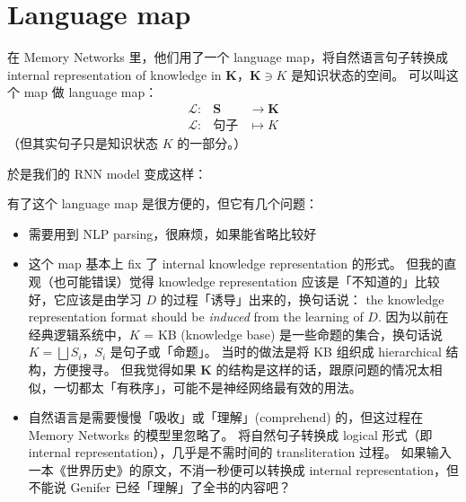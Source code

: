 \documentclass[12pt]{article}
\begin{document}
\section{Language map}

在 Memory Networks\cite{Weston2015} 里，他们用了一个 language map，将自然语言句子转换成 internal representation of knowledge in $\mathbf{K}$，$\mathbf{K} \ni K$ 是知识状态的空间。 可以叫这个 map 做 language map：
\begin{eqnarray}
\mathcal{L} :& \mathbf{S} & \rightarrow \mathbf{K} \nonumber \\
\mathcal{L} :& \mbox{句子} & \mapsto K \nonumber
\end{eqnarray}
（但其实句子只是知识状态 $K$ 的一部分。）

於是我们的 RNN model 变成这样：
\begin{center}
\end{center}

有了这个 language map 是很方便的，但它有几个问题：
\begin{itemize}

\item 需要用到 NLP parsing，很麻烦，如果能省略比较好

\item 这个 map 基本上 fix 了 internal knowledge representation 的形式。 但我的直观（也可能错误）觉得 knowledge representation 应该是「不知道的」比较好，它应该是由学习 $D$ 的过程「诱导」出来的，换句话说： the knowledge representation format should be \textit{induced} from the learning of $D$.  因为以前在经典逻辑系统中，$K$ = KB (knowledge base) 是一些命题的集合，换句话说 $ K = \bigsqcup S_i $，$S_i$ 是句子或「命题」。  当时的做法是将 KB 组织成 hierarchical 结构，方便搜寻。 但我觉得如果 $\mathbf{K}$ 的结构是这样的话，跟原问题的情况太相似，一切都太「有秩序」，可能不是神经网络最有效的用法。

\item 自然语言是需要慢慢「吸收」或「理解」(comprehend) 的，但这过程在 Memory Networks 的模型里忽略了。  将自然句子转换成 logical 形式（即 internal representation），几乎是不需时间的 transliteration 过程。  如果输入一本《世界历史》的原文，不消一秒便可以转换成 internal representation，但不能说 Genifer 已经「理解」了全书的内容吧？

\end{itemize}
\end{document}

